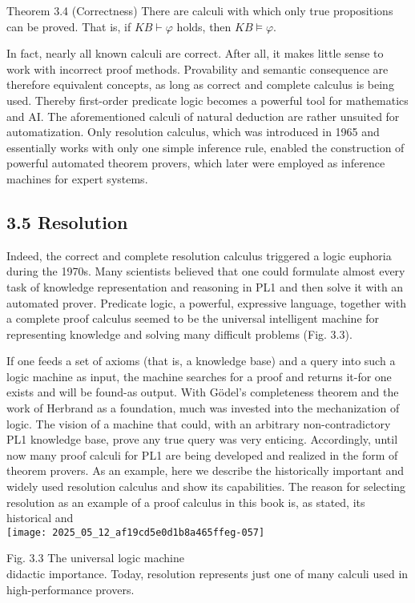 \documentclass[10pt]{article}
\begin{document}
Theorem 3.4 (Correctness) There are calculi with which only true propositions can be proved. That is, if $K B \vdash \varphi$ holds, then $K B \models \varphi$.

In fact, nearly all known calculi are correct. After all, it makes little sense to work with incorrect proof methods. Provability and semantic consequence are therefore equivalent concepts, as long as correct and complete calculus is being used. Thereby first-order predicate logic becomes a powerful tool for mathematics and AI. The aforementioned calculi of natural deduction are rather unsuited for automatization. Only resolution calculus, which was introduced in 1965 and essentially works with only one simple inference rule, enabled the construction of powerful automated theorem provers, which later were employed as inference machines for expert systems.

\subsection*{3.5 Resolution}
Indeed, the correct and complete resolution calculus triggered a logic euphoria during the 1970s. Many scientists believed that one could formulate almost every task of knowledge representation and reasoning in PL1 and then solve it with an automated prover. Predicate logic, a powerful, expressive language, together with a complete proof calculus seemed to be the universal intelligent machine for representing knowledge and solving many difficult problems (Fig. 3.3).

If one feeds a set of axioms (that is, a knowledge base) and a query into such a logic machine as input, the machine searches for a proof and returns it-for one exists and will be found-as output. With Gödel's completeness theorem and the work of Herbrand as a foundation, much was invested into the mechanization of logic. The vision of a machine that could, with an arbitrary non-contradictory PL1 knowledge base, prove any true query was very enticing. Accordingly, until now many proof calculi for PL1 are being developed and realized in the form of theorem provers. As an example, here we describe the historically important and widely used resolution calculus and show its capabilities. The reason for selecting resolution as an example of a proof calculus in this book is, as stated, its historical and\\
\texttt{[image: 2025\_05\_12\_af19cd5e0d1b8a465ffeg-057]}

Fig. 3.3 The universal logic machine\\
didactic importance. Today, resolution represents just one of many calculi used in high-performance provers.
\end{document}
